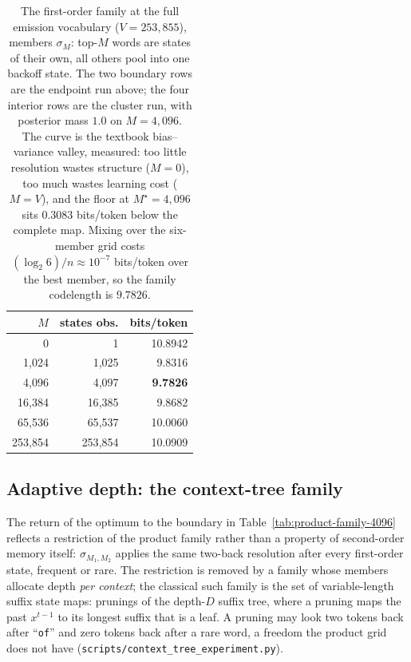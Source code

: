 \documentclass[11pt]{article}
\begin{document}
\begin{table}[ht]
\centering
\begin{tabular}{rrr}
\toprule
$M$ & states obs. & bits/token \\
\midrule
      0 &        1 & 10.8942 \\
 1{,}024 &  1{,}025 &  9.8316 \\
 4{,}096 &  4{,}097 & \textbf{9.7826} \\
16{,}384 & 16{,}385 &  9.8682 \\
65{,}536 & 65{,}537 & 10.0060 \\
253{,}854 & 253{,}854 & 10.0909 \\
\bottomrule
\end{tabular}
\caption{The first-order family at the full emission vocabulary
  ($V = 253{,}855$), members $\sigma_M$: top-$M$ words are states of
  their own, all others pool into one backoff state.  The two boundary
  rows are the endpoint run above; the four interior rows are the
  cluster run, with posterior mass $1.0$ on $M = 4{,}096$.  The curve
  is the textbook bias--variance valley, measured: too little
  resolution wastes structure ($M=0$), too much wastes learning cost
  ($M=V$), and the floor at $M^\star = 4{,}096$ sits $0.3083$
  bits/token below the complete map.  Mixing over the six-member grid
  costs $(\log_2 6)/n \approx 10^{-7}$ bits/token over the best
  member, so the family codelength is $9.7826$.}
\label{tab:interior-m}
\end{table}

\subsection{Adaptive depth: the context-tree family}
\label{sec:context-tree}

The return of the optimum to the boundary in
Table~\ref{tab:product-family-4096} reflects a restriction of the
product family rather than a property of second-order memory itself:
$\sigma_{M_1,M_2}$ applies the same two-back resolution after every
first-order state, frequent or rare.  The restriction is removed by a
family whose members allocate depth \emph{per context}; the classical
such family is the set of variable-length suffix state maps: prunings
of the depth-$D$ suffix tree, where a pruning maps the past $x^{t-1}$
to its longest suffix that is a leaf.  A pruning may look two tokens
back after ``\texttt{of}'' and zero tokens back after a rare word, a
freedom the product grid does not have
(\texttt{scripts/context\_tree\_experiment.py}).
\end{document}

